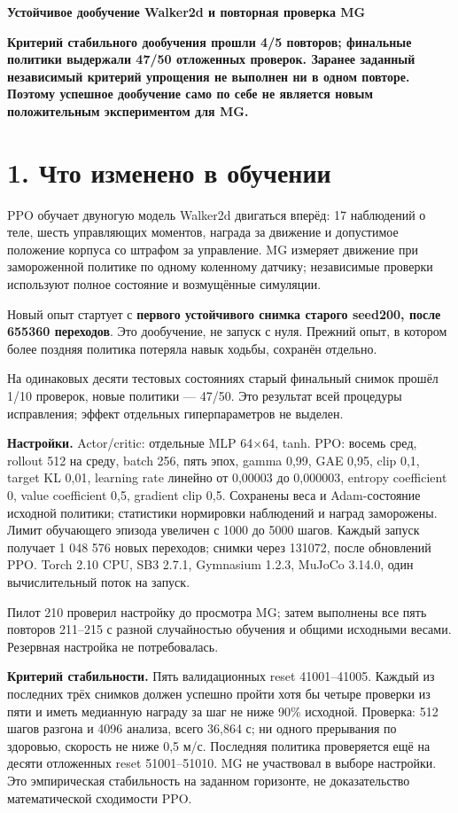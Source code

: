 \documentclass[10pt,a4paper]{article}
\begin{document}
{\Large\bfseries Устойчивое дообучение Walker2d и повторная проверка MG}\par\medskip

\textbf{Критерий стабильного дообучения прошли 4/5 повторов; финальные политики выдержали 47/50 отложенных проверок. Заранее заданный независимый критерий упрощения не выполнен ни в одном повторе. Поэтому успешное дообучение само по себе не является новым положительным экспериментом для MG.}

\section*{1. Что изменено в обучении}

PPO обучает двуногую модель Walker2d двигаться вперёд: 17 наблюдений о теле, шесть управляющих моментов, награда за движение и допустимое положение корпуса со штрафом за управление. MG измеряет движение при замороженной политике по одному коленному датчику; независимые проверки используют полное состояние и возмущённые симуляции.

Новый опыт стартует с \textbf{первого устойчивого снимка старого seed200, после 655360 переходов}. Это дообучение, не запуск с нуля. Прежний опыт, в котором более поздняя политика потеряла навык ходьбы, сохранён отдельно.

На одинаковых десяти тестовых состояниях старый финальный снимок прошёл 1/10 проверок, новые политики --- 47/50. Это результат всей процедуры исправления; эффект отдельных гиперпараметров не выделен.

\textbf{Настройки.} Actor/critic: отдельные MLP 64\ensuremath{\times}64, tanh. PPO: восемь сред, rollout 512 на среду, batch 256, пять эпох, gamma 0,99, GAE 0,95, clip 0,1, target KL 0,01, learning rate линейно от 0,00003 до 0,000003, entropy coefficient 0, value coefficient 0,5, gradient clip 0,5. Сохранены веса и Adam-состояние исходной политики; статистики нормировки наблюдений и наград заморожены. Лимит обучающего эпизода увеличен с 1000 до 5000 шагов. Каждый запуск получает 1 048 576 новых переходов; снимки через 131072, после обновлений PPO. Torch 2.10 CPU, SB3 2.7.1, Gymnasium 1.2.3, MuJoCo 3.14.0, один вычислительный поток на запуск.

Пилот 210 проверил настройку до просмотра MG; затем выполнены все пять повторов 211--215 с разной случайностью обучения и общими исходными весами. Резервная настройка не потребовалась.

\textbf{Критерий стабильности.} Пять валидационных reset 41001--41005. Каждый из последних трёх снимков должен успешно пройти хотя бы четыре проверки из пяти и иметь медианную награду за шаг не ниже 90\% исходной. Проверка: 512 шагов разгона и 4096 анализа, всего 36,864 с; ни одного прерывания по здоровью, скорость не ниже 0,5 м/с. Последняя политика проверяется ещё на десяти отложенных reset 51001--51010. MG не участвовал в выборе настройки. Это эмпирическая стабильность на заданном горизонте, не доказательство математической сходимости PPO.
\end{document}
